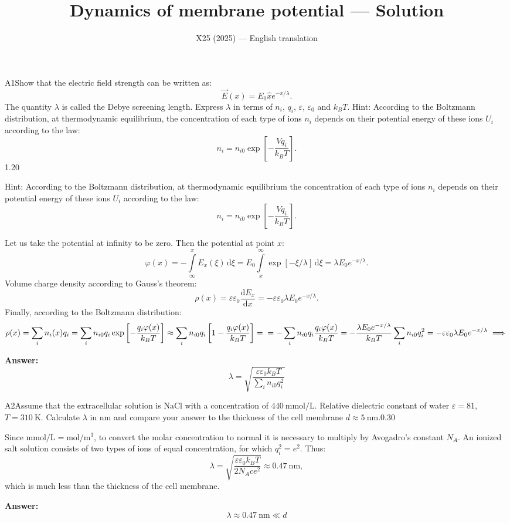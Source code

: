\documentclass[11pt,a4paper]{article}
\title{\textbf{Dynamics of membrane potential --- Solution}}
\author{\normalsize X25 (2025) — English translation}
\date{}
\begin{document}
\maketitle\vspace{-0.5em}
\begin{solcard}{A1}{Show that the electric field strength can be written as: \[\vec E(x)=E_0\hat xe^{-x/\lambda}.\]The quantity $\lambda$ is called the Debye screening length. Express $\lambda$ in terms of $n_i$, $q_i$, $\varepsilon$, $\varepsilon_0$ and $k_BT$. Hint: According to the Boltzmann distribution, at thermodynamic equilibrium, the concentration of each type of ions $n_i$ depends on their potential energy of these ions $U_i$ according to the law: \[n_i =n_{i0}\exp\left[-\dfrac{Vq_i}{k_BT}\right].\]}{1.20}

Hint: According to the Boltzmann distribution, at thermodynamic equilibrium the concentration of each type of ions $n_i$ depends on their potential energy of these ions $U_i$ according to the law: \[n_i =n_{i0}\exp\left[-\dfrac{Vq_i}{k_BT}\right].\]


Let us take the potential at infinity to be zero. Then the potential at point $x$:\[\varphi(x)=-\int\limits_{\infty}^xE_x(\xi)\,\mathrm d\xi=E_0\int\limits_x^\infty \exp[-{\xi}/{\lambda}]\,\mathrm d\xi=\lambda E_0  e^{-x/\lambda}.\]Volume charge density according to Gauss’s theorem:\[\rho(x)=\varepsilon\varepsilon_0\dfrac{\mathrm dE_x}{\mathrm dx}=-\varepsilon\varepsilon_0\lambda E_0e^{-x/\lambda}.\]Finally, according to the Boltzmann distribution:\[\rho(x)=\sum_in_i(x)q_i=\sum_in_{i0}q_i\exp\left[-\dfrac{q_i\varphi(x)}{k_BT}\right]\approx \sum_in_{i0}q_i\left[1-\dfrac{q_i\varphi(x)}{k_BT}\right]=\\=-\sum_in_{i0}q_i\dfrac{q_i\varphi(x)}{k_BT}=-\dfrac{\lambda E_0 e^{-x/\lambda}}{k_BT}\sum_in_{i0}q_i^2=-\varepsilon\varepsilon_0\lambda E_0e^{-x/\lambda}\implies\]

\par\smallskip\noindent\textbf{Answer:} \[\lambda=\sqrt{\dfrac{\varepsilon \varepsilon_0 k_BT}{\displaystyle\sum\limits_in_{i0}q_i^2}}\]
\end{solcard}

\begin{solcard}{A2}{Assume that the extracellular solution is $\mathrm{NaCl}$ with a concentration of $440~\mathrm{mmol}/\mathrm{L}$. Relative dielectric constant of water $\varepsilon= 81$, $T = 310~\mathrm{K}$. Calculate $\lambda$ in nm and compare your answer to the thickness of the cell membrane $d\approx 5~ \mathrm{nm}$.}{0.30}

Since $\text{mmol}/\text{L} = \text{mol}/\text{m}^3$, to convert the molar concentration to normal it is necessary to multiply by Avogadro’s constant $N_A$. An ionized salt solution consists of two types of ions of equal concentration, for which $q_i^2=e^2$. Thus: \[\lambda=\sqrt{\dfrac{\varepsilon\varepsilon_0 k_BT}{2N_Ace^2}}\approx0.47~\mathrm{nm},\]which is much less than the thickness of the cell membrane.

\par\smallskip\noindent\textbf{Answer:} \[\lambda\approx0.47~\mathrm{nm}\ll d\]
\end{solcard}
\end{document}
